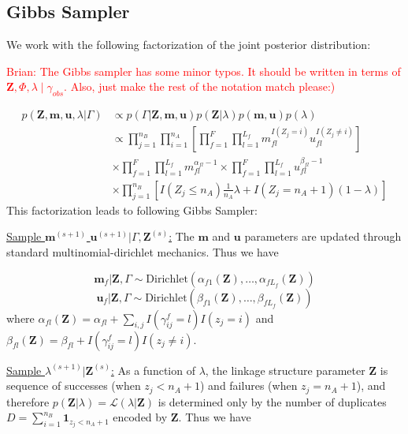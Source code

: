 \documentclass[12pt,letterpaper]{article}
\newcommand{\1}[1]{\mathbb{I}\!\left[#1\right]} %
\begin{document}
\newpage

\hypertarget{posterior-sampling}{%
	\subsection{Gibbs Sampler}
	\label{gibbs_sampling}}
We work with the following factorization of the joint posterior distribution:

\textcolor{red}{Brian: The Gibbs sampler has some minor typos. It should be written in terms of $\bm{Z}, \Phi, \lambda \mid \gamma_{obs}.$ Also, just make the rest of the notation match please:)}

\begin{align*}
p(\mathbf{Z}, \mathbf{m}, \mathbf{u}, \lambda|\Gamma) &\propto p(\Gamma|\mathbf{Z}, \mathbf{m}, \mathbf{u}) p(\mathbf{Z} | \lambda) p(\mathbf{m}, \mathbf{u}) p(\lambda) \\
&\propto \prod_{j=1}^{n_B}  \prod_{i=1}^{n_A}\left[ \prod_{f=1}^{F}\prod_{l=1}^{L_f} m_{fl}^{I(Z_j = i)}u_{fl}^{I(Z_j \neq i)}\right] \\
&\times  \prod_{f=1}^{F}\prod_{l=1}^{L_f} m_{fl}^{\alpha_{fl} - 1}  \times\prod_{f=1}^{F}\prod_{l=1}^{L_f} u_{fl}^{\beta_{fl} - 1} \\
&\times \prod_{j=1}^{n_B} \left[I(Z_j \leq n_A)\frac{1}{n_A}\lambda + I(Z_j = n_A + 1)(1 - \lambda)\right]
\end{align*}
This factorization leads to following Gibbs Sampler:

\underline{Sample $\mathbf{m}^{(s+1)}$ $\mathbf{u}^{(s+1)}|\Gamma, \mathbf{Z}^{(s)}$:}
The \(\mathbf{m}\) and \(\mathbf{u}\) parameters are updated through
standard multinomial-dirichlet mechanics. Thus we have

\[\mathbf{m}_f|\mathbf{Z}, \Gamma \sim \text{Dirichlet}(\alpha_{f1}(\mathbf{Z}), \ldots, \alpha_{fL_f}(\mathbf{Z}))\]
\[\mathbf{u}_f|\mathbf{Z}, \Gamma \sim \text{Dirichlet}(\beta_{f1}(\mathbf{Z}), \ldots, \beta_{fL_f}(\mathbf{Z}))\]
where
\(\alpha_{fl}(\mathbf{Z})= \alpha_{fl} + \sum_{i,j} I(\gamma_{ij}^f = l) I(z_j = i)\)
and
\(\beta_{fl}(\mathbf{Z})= \beta_{fl} + I(\gamma_{ij}^f = l) I(z_j \neq i)\).

\underline{Sample $\lambda^{(s+1)}|\mathbf{Z}^{(s)}$:} As a function of
\(\lambda\), the linkage structure parameter \(\mathbf{Z}\) is sequence
of successes (when \(z_j < n_A + 1\)) and failures (when
\(z_j = n_A + 1\)), and therefore
\(p(\mathbf{Z}|\lambda) = \mathcal{L}(\lambda|\mathbf{Z})\) is
determined only by the number of duplicates
\(D = \sum_{i=1}^{n_B}\mathbf{1}_{z_j < n_A + 1}\) encoded by
\(\mathbf{Z}\). Thus we have
\end{document}
